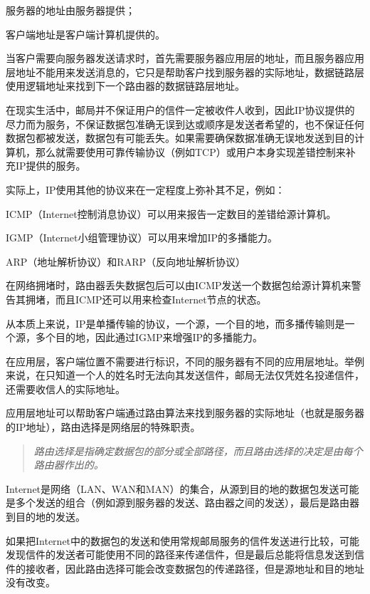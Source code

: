 \begin{compactitem}
\item 服务器的地址由服务器提供；
\item 客户端地址是客户端计算机提供的。
\end{compactitem}

当客户需要向服务器发送请求时，首先需要服务器应用层的地址，而且服务器应用层地址不能用来发送消息的，它只是帮助客户找到服务器的实际地址，数据链路层使用逻辑地址来找到下一个路由器的数据链路层地址。


在现实生活中，邮局并不保证用户的信件一定被收件人收到，因此IP协议提供的尽力而为服务，不保证数据包准确无误到达或顺序是发送者希望的，也不保证任何数据包都被发送，数据包有可能丢失。如果需要确保数据准确无误地发送到目的计算机，那么就需要使用可靠传输协议（例如TCP）或用户本身实现差错控制来补充IP提供的服务。

实际上，IP使用其他的协议来在一定程度上弥补其不足，例如：

\begin{compactitem}
\item ICMP（Internet控制消息协议）可以用来报告一定数目的差错给源计算机。
\item IGMP（Internet小组管理协议）可以用来增加IP的多播能力。
\item ARP（地址解析协议）和RARP（反向地址解析协议）
\end{compactitem}

在网络拥堵时，路由器丢失数据包后可以由ICMP发送一个数据包给源计算机来警告其拥堵，而且ICMP还可以用来检查Internet节点的状态。

从本质上来说，IP是单播传输的协议，一个源，一个目的地，而多播传输则是一个源，多个目的地，因此通过IGMP来增强IP的多播能力。

在应用层，客户端位置不需要进行标识，不同的服务器有不同的应用层地址。举例来说，在只知道一个人的姓名时无法向其发送信件，邮局无法仅凭姓名投递信件，还需要收信人的实际地址。

应用层地址可以帮助客户端通过路由算法来找到服务器的实际地址（也就是服务器的IP地址），路由选择是网络层的特殊职责。

\begin{quote}
\textsl{路由选择是指确定数据包的部分或全部路径，而且路由选择的决定是由每个路由器作出的。}
\end{quote}

Internet是网络（LAN、WAN和MAN）的集合，从源到目的地的数据包发送可能是多个发送的组合（例如源到服务器的发送、路由器之间的发送），最后是路由器到目的地的发送。

如果把Internet中的数据包的发送和使用常规邮局服务的信件发送进行比较，可能发现信件的发送者可能使用不同的路径来传递信件，但是最后总能将信息发送到信件的接收者，因此路由选择可能会改变数据包的传递路径，但是源地址和目的地址没有改变。

